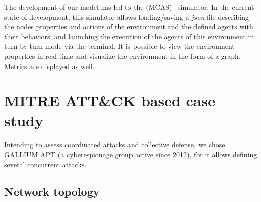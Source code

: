 \documentclass[conference]{IEEEtran}
\newcommand{\rem}[1]{\textcolor{red}{#1}}
\begin{document}
The development of our model has led to the  (MCAS)~\cite{MCASWebsite} simulator. In the current state of development, this simulator allows loading/saving a \textit{json} file describing the nodes properties and actions of the environment and the defined agents with their behaviors; and launching the execution of the agents of this environment in turn-by-turn mode via the terminal. It is possible to view the environment properties in real time and visualize the environment in the form of a graph. Metrics are displayed as well.



\section{MITRE ATT\&CK based case study}


\noindent
Intending to assess coordinated attacks and collective defense, we chose GALLIUM APT (a cyberespionage group active since 2012), for it allows defining several concurrent attacks.


\subsection{Network topology}

\end{document}
